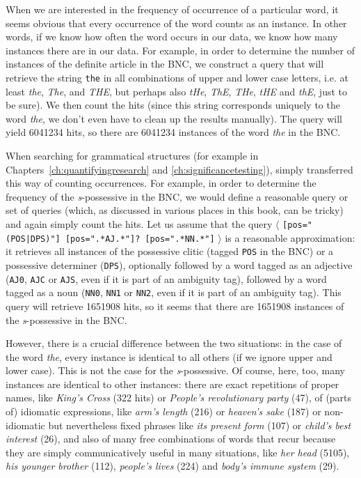 When we are interested in the frequency  of occurrence of a particular word, it seems obvious that every occurrence of the word counts as an instance. In other words, if we know how often the word occurs in our data, we know how many instances there are in our data. For example, in order to determine the number of instances of the definite article  in the BNC,  we construct a query that will retrieve  the string \texttt{the} in all combinations of upper and lower case letters, i.e. at least \textit{the}, \textit{The}, and \textit{THE}, but perhaps also \textit{tHe}, \textit{ThE}, \textit{THe}, \textit{tHE} and \textit{thE}, just to be sure). We then count the hits (since this string corresponds uniquely to the word \textit{the}, we don't even have to clean up the results manually).  The query will yield \num{6041234} hits, so there are \num{6041234} instances of the word \textit{the} in the  BNC.

When searching for grammatical  structures (for example in Chapters~\ref{ch:quantifyingresearch} and \ref{ch:significancetesting}), simply transferred this way of counting occurrences. For example, in order to determine the frequency  of the \textit{s}-possessive  in the BNC,  we would define a reasonable query or set of queries (which, as discussed in various places in this book, can be tricky) and again simply count the hits.  Let us assume that the query $\langle$ \texttt{[pos="(POS|DPS)"] [pos=".*AJ.*"]? [pos=".*NN.*"]} $\rangle$ is a reasonable approximation: it retrieves  all instances of the possessive clitic  (tagged \texttt{POS} in the BNC)  or a possessive determiner  (\texttt{DPS}), optionally followed by a word tagged  as an adjective  (\texttt{AJ0}, \texttt{AJC} or \texttt{AJS}, even if it is part of an ambiguity  tag), followed by a word tagged as a noun  (\texttt{NN0}, \texttt{NN1} or \texttt{NN2}, even if it is part of an ambiguity tag). This query will retrieve \num{1651908} hits, so it seems that there are \num{1651908} instances of the \textit{s}-possessive  in the  BNC.

However, there is a crucial difference between the two situations: in the case of the word \textit{the}, every instance is identical to all others (if we ignore upper and lower case). This is not the case for the \textit{s}-possessive. Of course, here, too, many instances are identical to other instances: there are exact repetitions of proper names, like \textit{King's Cross} (322 hits) or \textit{People's revolutionary party} (47), of (parts of) idiomatic  expressions, like \textit{arm's length} (216) or \textit{heaven's sake} (187) or non\hyp{}idiomatic but nevertheless fixed phrases like \textit{its present form} (107) or \textit{child's best interest} (26), and also of many free combinations of words that recur because they are simply communicatively useful in many situations, like \textit{her head} (5105), \textit{his younger brother} (112), \textit{people's lives} (224) and \textit{body's immune system} (29).

